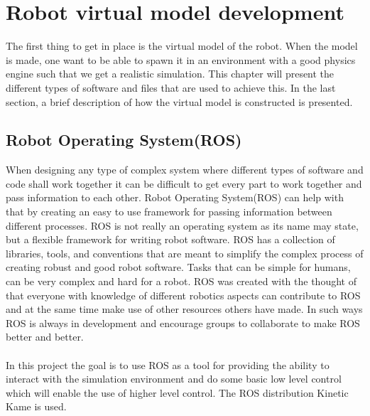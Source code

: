 \chapter{Robot virtual model development}\label{chap:soft}
The first thing to get in place is the virtual model of the robot. When the model is made, one want to be able to spawn it in an environment with a good physics engine such that we get a realistic simulation. This chapter will present the different types of software and files that are used to achieve this. In the last section, a brief description of how the virtual model is constructed is presented.   %




\section{Robot Operating System(ROS)}
When designing any type of complex system where different types of software and code shall work together it can be difficult to get every part to work together and pass information to each other. Robot Operating System(ROS) can help with that by creating an easy to use framework for passing information between different processes\cite{ROS}. ROS is not really an operating system as its name may state, but a flexible framework for writing robot software\cite{ROS}. ROS has a collection of libraries, tools, and conventions that are meant to simplify the complex process of creating robust and good robot software. Tasks that can be simple for humans, can be very complex and hard for a robot. ROS was created with the thought of that everyone with knowledge of different robotics aspects can contribute to ROS and at the same time make use of other resources others have made. In such ways ROS is always in development and encourage groups to collaborate to make ROS better and better. \\\\
In this project the goal is to use ROS as a tool for providing the ability to interact with the simulation environment and do some basic low level control which will enable the use of higher level control. The ROS distribution Kinetic Kame is used\cite{ROS}.


